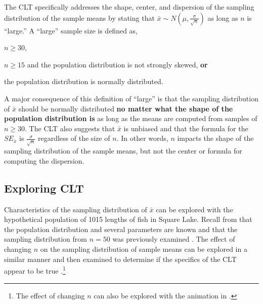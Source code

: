 \documentclass[10pt,openany]{book}\usepackage[]{graphicx}\usepackage[]{color}
\begin{document}
The CLT specifically addresses the shape, center, and dispersion of the sampling distribution of the sample means by stating that $\bar{x}\sim N\left(\mu,\frac{\sigma}{\sqrt{n}}\right)$ as long as $n$ is ``large.''  A ``large'' sample size is defined as,
\vspace{-12pt}
\begin{Enumerate}
  \item $n\geq30$,
  \item $n\geq15$ and the population distribution is not strongly skewed, \textbf{or}
  \item the population distribution is normally distributed.
\end{Enumerate}
A major consequence of this definition of ``large'' is that the sampling distribution of $\bar{x}$ should be normally distributed \textbf{no matter what the shape of the population distribution is} as long as the means are computed from samples of $n\geq30$.  The CLT also suggests that $\bar{x}$ is unbiased and that the formula for the $SE_{\bar{x}}$ is $\frac{\sigma}{\sqrt{n}}$ regardless of the size of $n$.  In other words, $n$ impacts the shape of the sampling distribution of the sample means, but not the center or formula for computing the dispersion.


\subsection{Exploring CLT}
Characteristics of the sampling distribution of $\bar{x}$ can be explored with the hypothetical population of 1015 lengths of fish in Square Lake.  Recall from  that the population distribution  and several parameters are known  and that the sampling distribution from $n=50$ was previously examined .  The effect of changing $n$ on the sampling distribution of sample means can be explored in a similar manner and then examined to determine if the specifics of the CLT appear to be true .\footnote{The effect of changing $n$ can also be explored with the animation in .}
\end{document}
